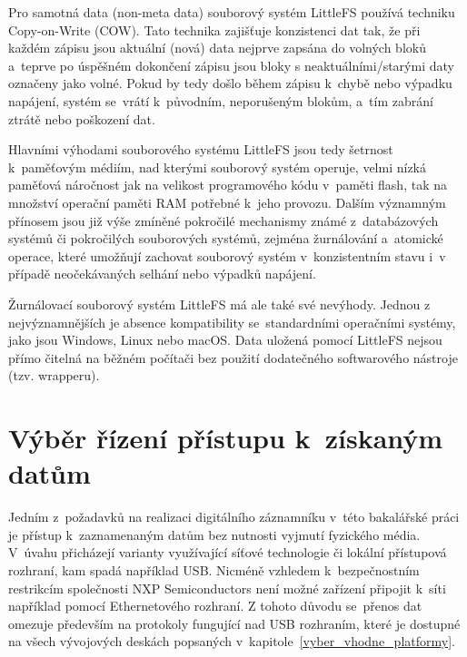 Pro samotná data (non-meta data) souborový systém LittleFS používá techniku Copy-on-Write (COW). Tato technika zajišťuje konzistenci dat tak, že při každém zápisu jsou aktuální (nová) data nejprve zapsána do volných bloků a~teprve po úspěšném dokončení zápisu jsou bloky s neaktuálními/starými daty označeny jako volné. Pokud by tedy došlo během zápisu k~chybě nebo výpadku napájení, systém se~vrátí k~původním, neporušeným blokům, a~tím zabrání ztrátě nebo poškození dat.~\cite{nxp_the_design_of_the_little_filesystem}

Hlavními výhodami souborového systému LittleFS jsou tedy šetrnost k~paměťovým médiím, nad kterými souborový systém operuje, velmi nízká paměťová náročnost jak na velikost programového kódu v~paměti flash, tak na množství operační paměti RAM potřebné k~jeho provozu. Dalším významným přínosem jsou již výše zmíněné pokročilé mechanismy známé z~databázových systémů či pokročilých souborových systémů, zejména žurnálování a~atomické operace, které umožňují zachovat souborový systém v~konzistentním stavu i~v případě neočekávaných selhání nebo výpadků napájení.~\cite{nxp_the_design_of_the_little_filesystem}

Žurnálovací souborový systém LittleFS má ale také své nevýhody. Jednou z nejvýznamnějších je absence kompatibility se~standardními operačními systémy, jako jsou Windows, Linux nebo macOS. Data uložená pomocí LittleFS nejsou přímo čitelná na běžném počítači bez použití dodatečného softwarového nástroje (tzv. wrapperu).~\cite{cnx_software_little_fs}



\section{Výběr řízení přístupu k~získaným datům}
\label{vyber_rizeni_pristupu_k_ziskanym_datum}
Jedním z~požadavků na realizaci digitálního záznamníku v~této bakalářské práci je přístup k~zaznamenaným datům bez nutnosti vyjmutí fyzického média. V~úvahu přicházejí varianty využívající síťové technologie či lokální přístupová rozhraní, kam spadá například USB. Nicméně vzhledem k~bezpečnostním restrikcím společnosti NXP Semiconductors není možné zařízení připojit k~síti například pomocí Ethernetového rozhraní. Z tohoto důvodu se~přenos dat omezuje především na protokoly fungující nad USB rozhraním, které je dostupné na všech vývojových deskách popsaných v~kapitole~\ref{vyber_vhodne_platformy}.

